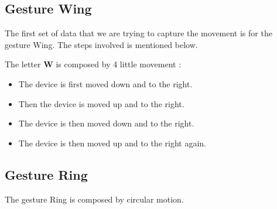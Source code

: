 \subsection{Gesture Wing}

The first set of data that we are trying to capture the movement is for the gesture Wing. The steps involved  is mentioned below.

\begin{center}
\end{center}


The letter \textbf{W} is composed by 4 little movement : 

\begin{itemize}
    \item The device is first moved down and to the right.
    \item Then the device is moved up and to the right.
    \item The device is then moved down and to the right.
    \item  The device is then moved up and to the right again. 
\end{itemize}


\subsection{Gesture Ring}

The gesture Ring is composed by circular motion.  

\begin{center}
    
\end{center}

